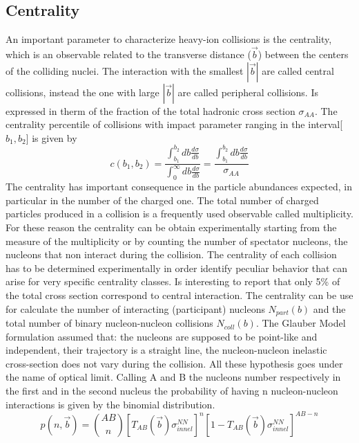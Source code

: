 \documentclass[12pt,a4paper]{book}
\begin{document}
	\subsection{Centrality}
	An important parameter to characterize heavy-ion collisions is the centrality, which is an	observable related to the transverse distance ($\vec{b}$) between the centers of the colliding nuclei. The interaction with the smallest $|\vec{b}|$ are called central collisions, instead the one with large $|\vec{b}|$ are called peripheral collisions. Is expressed in therm of the fraction of the total hadronic cross section $\sigma_{AA}$. The centrality percentile of collisions with impact parameter ranging in the interval[$b_1,b_2$] is given by
	\begin{equation}
		c(b_1,b_2)=\frac{\int_{b_1}^{b_2} db \frac{d\sigma}{db}}{\int_{0}^{\infty} db \frac{d\sigma}{db}} = \frac{\int_{b_1}^{b_2} db \frac{d\sigma}{db}}{\sigma_{AA}}
		\label{eq:centrrality1}
	\end{equation}
	The centrality has important consequence in the particle abundances expected, in particular in the number of the charged one. The total number of charged particles produced in a collision is a frequently used observable called multiplicity. For these reason the centrality can be obtain experimentally starting from the measure of the multiplicity or by counting the number of spectator nucleons, the nucleons that non interact during the collision. The centrality of each collision has to be determined experimentally in order identify	peculiar behavior that can arise for very specific centrality classes. Is interesting to report that only 5\% of the total cross section correspond to central interaction. \cite{amsdottorato9036}
	The centrality can be use for calculate the number of interacting (participant) nucleons $N_{part}(b)$ and the total number of binary nucleon-nucleon collisions $N_{coll}(b)$. The Glauber Model formulation \cite{Miller_2007} assumed that: the nucleons are supposed to be point-like and independent, their trajectory is a straight line, the nucleon-nucleon inelastic cross-section	does not vary during the collision. All these hypothesis goes under the name of optical limit. Calling A and B the nucleons number respectively in the first and in the second nucleus the probability of having n nucleon-nucleon interactions is given by the binomial distribution.
	\begin{equation}
		p(n,\vec{b})= \binom{AB}{n} \left[T_{AB}(\vec{b}) \sigma_{innel}^{NN}\right]^n \left[1-T_{AB}(\vec{b}) \sigma_{innel}^{NN}\right]^{AB-n}
		\label{eq:prob_interaction}
	\end{equation}
\end{document}
